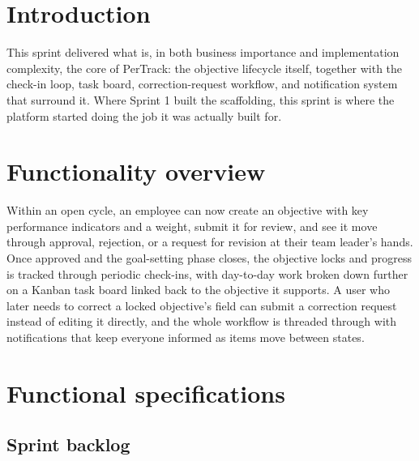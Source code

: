 \documentclass[12pt,a4paper]{report}
\begin{document}
\section{Introduction}

This sprint delivered what is, in both business importance and implementation complexity, the core of PerTrack: the objective lifecycle itself, together with the check-in loop, task board, correction-request workflow, and notification system that surround it. Where Sprint 1 built the scaffolding, this sprint is where the platform started doing the job it was actually built for.

\section{Functionality overview}

Within an open cycle, an employee can now create an objective with key performance indicators and a weight, submit it for review, and see it move through approval, rejection, or a request for revision at their team leader's hands. Once approved and the goal-setting phase closes, the objective locks and progress is tracked through periodic check-ins, with day-to-day work broken down further on a Kanban task board linked back to the objective it supports. A user who later needs to correct a locked objective's field can submit a correction request instead of editing it directly, and the whole workflow is threaded through with notifications that keep everyone informed as items move between states.

\section{Functional specifications}

\subsection{Sprint backlog}
\end{document}
